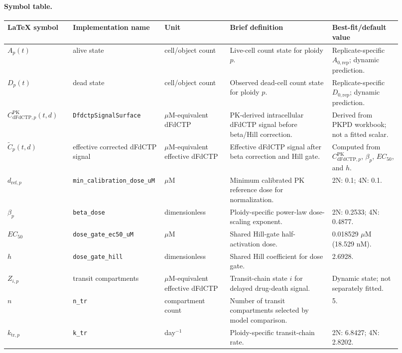 \paragraph{Symbol table.}
\begin{center}
\footnotesize
\begin{tabular}{p{0.16\linewidth}p{0.18\linewidth}p{0.16\linewidth}p{0.25\linewidth}p{0.17\linewidth}}
\hline
LaTeX symbol & Implementation name & Unit & Brief definition & Best-fit/default value \\
\hline
$A_p(t)$ & alive state & cell/object count & Live-cell count state for ploidy $p$. & Replicate-specific $A_{0,\mathrm{rep}}$; dynamic prediction. \\
$D_p(t)$ & dead state & cell/object count & Observed dead-cell count state for ploidy $p$. & Replicate-specific $D_{0,\mathrm{rep}}$; dynamic prediction. \\
$C_{\mathrm{dFdCTP},p}^{\mathrm{PK}}(t,d)$ & \texttt{DfdctpSignalSurface} & $\mu$M-equivalent dFdCTP & PK-derived intracellular dFdCTP signal before beta/Hill correction. & Derived from PKPD workbook; not a fitted scalar. \\
$\widetilde{C}_{p}(t,d)$ & effective corrected dFdCTP signal & $\mu$M-equivalent effective dFdCTP & Effective dFdCTP signal after beta correction and Hill gate. & Computed from $C_{\mathrm{dFdCTP},p}^{\mathrm{PK}}$, $\beta_p$, $EC_{50}$, and $h$. \\
$d_{\mathrm{ref},p}$ & \texttt{min\_calibration\_dose\_uM} & $\mu$M & Minimum calibrated PK reference dose for normalization. & 2N: 0.1; 4N: 0.1. \\
$\beta_p$ & \texttt{beta\_dose} & dimensionless & Ploidy-specific power-law dose-scaling exponent. & 2N: 0.2533; 4N: 0.4877. \\
$EC_{50}$ & \texttt{dose\_gate\_ec50\_uM} & $\mu$M & Shared Hill-gate half-activation dose. & 0.018529 $\mu$M (18.529 nM). \\
$h$ & \texttt{dose\_gate\_hill} & dimensionless & Shared Hill coefficient for dose gate. & 2.6928. \\
$Z_{i,p}$ & transit compartments & $\mu$M-equivalent effective dFdCTP & Transit-chain state $i$ for delayed drug-death signal. & Dynamic state; not separately fitted. \\
$n$ & \texttt{n\_tr} & compartment count & Number of transit compartments selected by model comparison. & 5. \\
$k_{\mathrm{tr},p}$ & \texttt{k\_tr} & day$^{-1}$ & Ploidy-specific transit-chain rate. & 2N: 6.8427; 4N: 2.8202. \\

\end{tabular}
\end{center}
